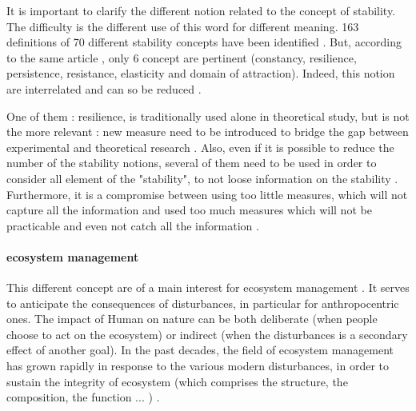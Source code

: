 \documentclass{article}
\begin{document}
It is important to clarify the different notion related to the concept of stability. The difficulty is the different use of this word for different meaning. 163 definitions of 70 different stability concepts have been identified \cite{grimm1997babel}. %
But, according to the same article \cite{grimm1997babel}, only 6 concept are pertinent (constancy, resilience, persistence, resistance, elasticity and domain of attraction). Indeed, this notion are interrelated and can so be reduced \cite{donohue2013dimensionality}.

One of them : resilience, is traditionally used alone in theoretical study, but is not the more relevant : new measure need to be introduced to bridge the gap between experimental and theoretical research \cite{arnoldi2016resilience} \cite{gunderson2000ecological} \cite{neubert_alternatives_1997} . Also, even if it is possible to reduce the number of the stability notions, several of them need to be used in order to consider all element of the "stability", to not loose information on the stability \cite{derissen_relationship_2011}. Furthermore, it is a compromise between using too little measures, which will not capture all the information and used too much measures which will not be practicable and even not catch all the information \cite{hillebrand2018decomposing}.









\paragraph{ecosystem management \\}

This different concept are of a main interest for ecosystem management \cite{mumby2014ecological}. It serves to anticipate the consequences of disturbances, in particular for anthropocentric ones. The impact of Human on nature can be both deliberate (when people choose to act on the ecosystem) or indirect (when the disturbances is a secondary effect of another goal). In the past decades, the field of ecosystem management has grown rapidly \cite{grumbine1997reflections} in response to the various modern disturbances, in order to sustain the integrity of ecosystem (which comprises the structure, the composition, the function ... ) \cite{jensen1994overview}. 
\end{document}
